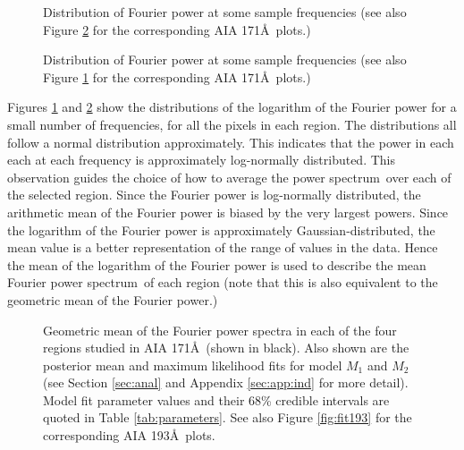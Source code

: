 \documentclass{aastex}
\newcommand{\PS}{power spectrum}
\newcommand{\Fps}{Fourier \PS}
\begin{document}
{\begin{figure}
\caption{Distribution of Fourier power at some sample frequencies (see also Figure \ref{fig:dist193} for the corresponding AIA 171\AA\ plots.)}
\label{fig:dist171}
\end{figure}

\begin{figure}
\caption{Distribution of Fourier power at some sample frequencies (see
  also Figure \ref{fig:dist171} for the corresponding AIA
  171\AA\ plots.)}
\label{fig:dist193}
\end{figure}
Figures \ref{fig:dist171} and \ref{fig:dist193} show the distributions
of the logarithm of the Fourier power for a small number of
frequencies, for all the pixels in each region.  The distributions all
follow a normal distribution approximately.  This indicates that the
power in each each at each frequency is approximately log-normally
distributed.  This observation guides the choice of how to average the
\PS\ over each of the selected region.  Since the Fourier
power is log-normally distributed, the arithmetic mean of the Fourier
power is biased by the very largest powers.  Since the logarithm of
the Fourier power is approximately Gaussian-distributed, the mean
value is a better representation of the range of values in the data.
Hence the mean of the logarithm of the Fourier power is used to
describe the mean \Fps\ of each region (note that
this is also equivalent to the geometric mean of the Fourier power.)



\begin{figure}
\caption{Geometric mean of the Fourier power spectra in each of the
  four regions studied in AIA 171\AA\ (shown in black).  Also shown
  are the posterior mean and maximum likelihood fits for model $M_{1}$
  and $M_{2}$ (see Section \ref{sec:anal} and Appendix
  \ref{sec:app:ind} for more detail).  Model fit parameter values and
  their 68\% credible intervals are quoted in Table
  \ref{tab:parameters}. See also Figure \ref{fig:fit193} for the
  corresponding AIA 193\AA\ plots.}
\label{fig:fit171}
\end{figure}

}
\end{document}
